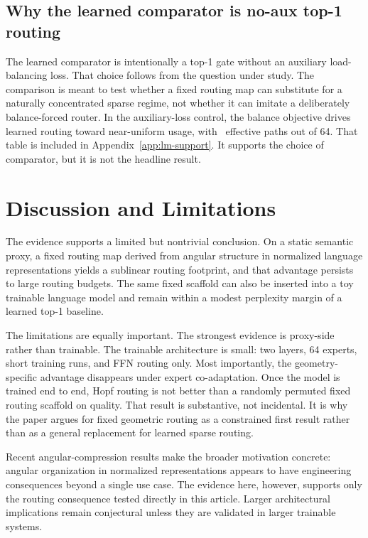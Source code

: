\documentclass[11pt,letterpaper]{article}
\begin{document}
\subsection{Why the learned comparator is no-aux top-1 routing}
The learned comparator is intentionally a top-1 gate without an auxiliary load-balancing loss. That choice follows from the question under study. The comparison is meant to test whether a fixed routing map can substitute for a naturally concentrated sparse regime, not whether it can imitate a deliberately balance-forced router. In the auxiliary-loss control, the balance objective drives learned routing toward near-uniform usage, with \PaperAuxSparseEff\ effective paths out of 64. That table is included in Appendix~\ref{app:lm-support}. It supports the choice of comparator, but it is not the headline result.

\section{Discussion and Limitations}
The evidence supports a limited but nontrivial conclusion. On a static semantic proxy, a fixed routing map derived from angular structure in normalized language representations yields a sublinear routing footprint, and that advantage persists to large routing budgets. The same fixed scaffold can also be inserted into a toy trainable language model and remain within a modest perplexity margin of a learned top-1 baseline.

The limitations are equally important. The strongest evidence is proxy-side rather than trainable. The trainable architecture is small: two layers, 64 experts, short training runs, and FFN routing only. Most importantly, the geometry-specific advantage disappears under expert co-adaptation. Once the model is trained end to end, Hopf routing is not better than a randomly permuted fixed routing scaffold on quality. That result is substantive, not incidental. It is why the paper argues for fixed geometric routing as a constrained first result rather than as a general replacement for learned sparse routing.

Recent angular-compression results make the broader motivation concrete: angular organization in normalized representations appears to have engineering consequences beyond a single use case. The evidence here, however, supports only the routing consequence tested directly in this article. Larger architectural implications remain conjectural unless they are validated in larger trainable systems.
\end{document}

